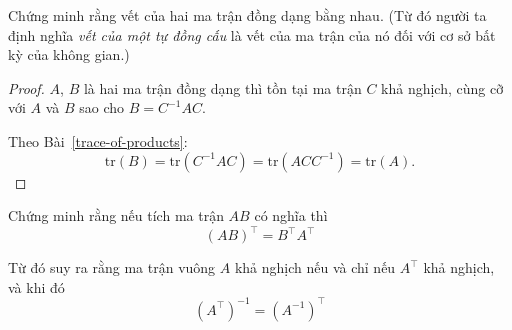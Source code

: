 \begin{exercise}
    Chứng minh rằng vết của hai ma trận đồng dạng bằng nhau. (Từ đó người ta định nghĩa \textit{vết của một tự đồng cấu} là vết của ma trận của nó đối với cơ sở bất kỳ của không gian.)
\end{exercise}

\begin{proof}
    $A$, $B$ là hai ma trận đồng dạng thì tồn tại ma trận $C$ khả nghịch, cùng cỡ với $A$ và $B$ sao cho $B = C^{-1}AC$.
    \par Theo Bài~\ref{trace-of-products}:
    \[
        \text{tr}(B) = \text{tr}(C^{-1}AC) = \text{tr}(ACC^{-1}) = \text{tr}(A).
    \]
\end{proof}

\begin{exercise}
    Chứng minh rằng nếu tích ma trận $AB$ có nghĩa thì
    \[
        {(AB)}^{\top} = B^{\top}A^{\top}
    \]
    \par Từ đó suy ra rằng ma trận vuông $A$ khả nghịch nếu và chỉ nếu $A^{\top}$ khả nghịch, và khi đó
    \[
        {(A^{\top})}^{-1} = {(A^{-1})}^{\top}
    \]
\end{exercise}

